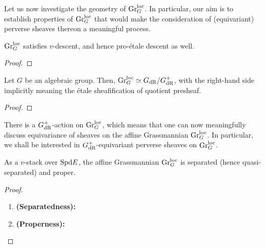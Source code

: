                 Let us now investigate the geometry of $\mathrm{Gr}_G^{\mathrm{loc}}$. In particular, our aim is to establish properties of $\mathrm{Gr}_G^{\mathrm{loc}}$ that would make the consideration of (equivariant) perverse sheaves thereon a meaningful process.
                \begin{lemma} \label{lemma: B_dR_affine_grassmannians_are_v_sheaves}
                    $\mathrm{Gr}_G^{\mathrm{loc}}$ satisfies $v$-descent, and hence pro-\'etale descent as well.
                \end{lemma}
                    \begin{proof}
                        
                    \end{proof}
                \begin{proposition} \label{prop: B_dR_affine_grassmannian_as_coset_spaces}
                    Let $G$ be an algebraic group. Then, $\mathrm{Gr}_G^{\mathrm{loc}} \simeq G_{\mathrm{dR}}/G_{\mathrm{dR}}^+$, with the right-hand side implicitly meaning the \'etale sheafification of quotient presheaf.
                \end{proposition}
                    \begin{proof}
                        
                    \end{proof}
                \begin{corollary} \label{coro: loop_group_action_on_B_dR_grassmannians}
                    There is a $G_{\mathrm{dR}}^+$-action on $\mathrm{Gr}_G^{\mathrm{loc}}$, which means that one can now meaningfully discuss equivariance of sheaves on the affine Grassmannian $\mathrm{Gr}_G^{\mathrm{loc}}$. In particular, we shall be interested in $G_{\mathrm{dR}}^+$-equivariant perverse sheaves on $\mathrm{Gr}_G^{\mathrm{loc}}$.
                \end{corollary}
                
                \begin{proposition} \label{prop: structure_of_B_dR_affine_grassmannian}
                    As a $v$-stack over $\mathrm{Spd} E$, the affine Grassmannian $\mathrm{Gr}_G^{\mathrm{loc}}$ is separated (hence quasi-separated) and proper.
                \end{proposition}
                    \begin{proof}
                        \noindent
                        \begin{enumerate}
                            \item \textbf{(Separatedness):}
                            \item \textbf{(Properness):}
                        \end{enumerate}
                    \end{proof}
                
